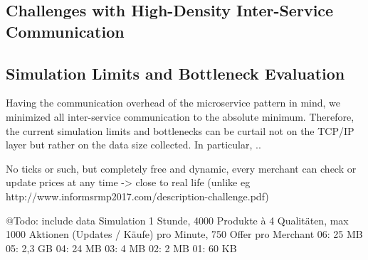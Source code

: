 %
\subsection{Challenges with High-Density Inter-Service Communication}
%

%
\subsection{Simulation Limits and Bottleneck Evaluation}
%
Having the communication overhead of the microservice pattern in mind, we minimized all inter-service communication to the absolute minimum. Therefore, the current simulation limits and bottlenecks can be curtail not on the TCP/IP layer but rather on the data size collected. In particular, ..


No ticks or such, but completely free and dynamic, every merchant can check or update prices at any time -> close to real life (unlike eg http://www.informsrmp2017.com/description-challenge.pdf)



@Todo: include data
Simulation 1 Stunde, 4000 Produkte à 4 Qualitäten, max 1000 Aktionen (Updates / Käufe) pro Minute, 750 Offer pro Merchant
06: 25 MB
05: 2,3 GB
04: 24 MB
03: 4 MB
02: 2 MB
01: 60 KB


